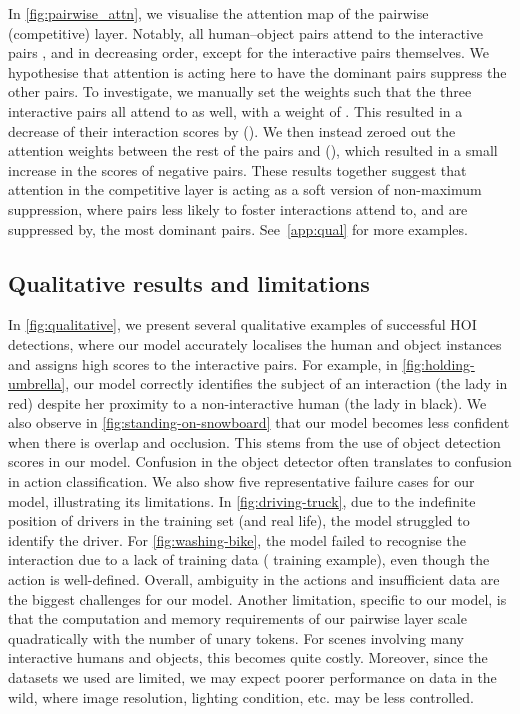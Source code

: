 \documentclass[10pt,twocolumn,letterpaper]{article}
\begin{document}
In \cref{fig:pairwise_attn}, we visualise the attention map of the pairwise (competitive) layer. Notably, all human--object pairs attend to the interactive pairs ,  and  in decreasing order, except for the interactive pairs themselves. We hypothesise that attention is acting here to have the dominant pairs suppress the other pairs. To investigate, we manually set the weights such that the three interactive pairs all attend to  as well, with a weight of . This resulted in a decrease of their interaction scores by  (). We then instead zeroed out the attention weights between the rest of the pairs and (), which resulted in a small increase in the scores of negative pairs. These results together suggest that attention in the competitive layer is acting as a soft version of non-maximum suppression, where pairs less likely to foster interactions attend to, and are suppressed by, the most dominant pairs. See~\cref{app:qual} for more examples.

\subsection{Qualitative results and limitations}
\vspace{-8pt}

In \cref{fig:qualitative}, we present several qualitative examples of successful HOI detections, where our model accurately localises the human and object instances and assigns high scores to the interactive pairs. For example, in \cref{fig:holding-umbrella}, our model correctly identifies the subject of an interaction (the lady in red) despite her proximity to a non-interactive human (the lady in black). We also observe in \cref{fig:standing-on-snowboard} that our model becomes less confident when there is overlap and occlusion. This stems from the use of object detection scores in our model. Confusion in the object detector often translates to confusion in action classification.
We also show five representative failure cases for our model, illustrating its limitations. In \cref{fig:driving-truck}, due to the indefinite position of drivers in the training set (and real life), the model struggled to identify the driver. For \cref{fig:washing-bike}, the model failed to recognise the interaction due to a lack of training data ( training example), even though the action is well-defined. Overall, ambiguity in the actions and insufficient data are the biggest challenges for our model.
Another limitation, specific to our model, is that the computation and memory requirements of our pairwise layer scale quadratically with the number of unary tokens. For scenes involving many interactive humans and objects, this becomes quite costly.
Moreover, since the datasets we used are limited, we may expect poorer performance on 
    data in the wild, where image resolution, lighting condition, etc. may be less controlled.
\end{document}
